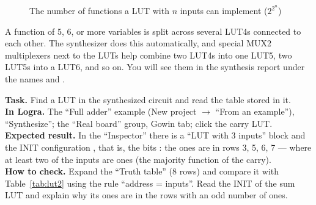 \begin{figure}[H]
\centering
{}
\caption{The number of functions a LUT with $n$ inputs can implement ($2^{2^n}$)}
\end{figure}

\begin{warnbox}
A function of 5, 6, or more variables is split across several LUT4s
connected to each other. The synthesizer does this automatically, and
special MUX2 multiplexers next to the LUTs help combine two LUT4s into
one LUT5, two LUT5s into a LUT6, and so on. You will see them in the synthesis report
under the names  and .
\end{warnbox}

\begin{diybox}
\textbf{Task.} Find a LUT in the synthesized circuit and read the table stored in it.\\
\textbf{In Logra.} The ``Full adder'' example (New project $\to$ ``From an example''), ``Synthesize''; the ``Real board'' group, Gowin tab; click the carry LUT.\\
\textbf{Expected result.} In the ``Inspector'' there is a ``LUT with 3 inputs'' block and the INIT configuration , that is, the bits : the ones are in rows 3, 5, 6, 7 --- where at least two of the inputs are ones (the majority function of the carry).\\
\textbf{How to check.} Expand the ``Truth table'' (8 rows) and compare it with Table~\ref{tab:lut2} using the rule ``address = inputs''.  Read the INIT of the sum LUT and explain why its ones are in the rows with an odd number of ones.
\end{diybox}


